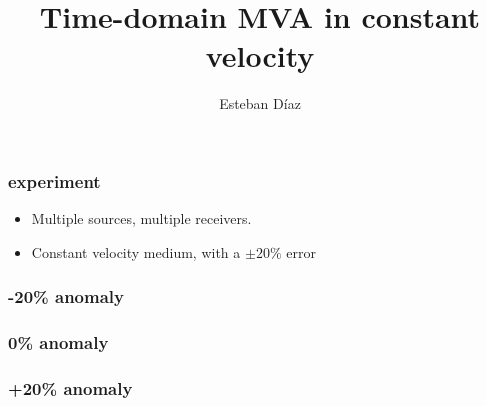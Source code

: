 



\title[]{Time-domain MVA in constant velocity}
\subtitle{}
\author[]{Esteban  D\'{i}az}
\date{}
\logo{}

\def\big#1{\begin{center} \LARGE \textbf{#1} \end{center}}
\def\cen#1{\begin{center}        \textbf{#1} \end{center}}

 { \cwpcover }

\begin{frame}

\end{frame}


\begin{frame} \frametitle{experiment}
\begin{itemize}

\item Multiple sources, multiple receivers.
\item Constant velocity medium, with a $\pm20\%$ error
\end{itemize}
\end{frame}





\begin{frame}\frametitle{-20\% anomaly}
\end{frame}

\begin{frame}\frametitle{0\% anomaly} 
\end{frame}
\begin{frame}\frametitle{+20\% anomaly} 
\end{frame}


